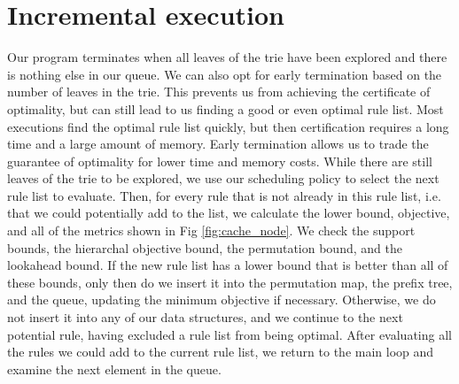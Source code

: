 \section{Incremental execution}
Our program terminates when all leaves of the trie have been explored and there is nothing else in our queue.
We can also opt for early termination based on the number of leaves in the trie.
This prevents us from achieving the certificate of optimality, but can still lead to us finding a good or even optimal rule list.
Most executions find the optimal rule list quickly, but then certification requires a long time and a large amount of memory.
Early termination allows us to trade the guarantee of optimality for lower time and memory costs.
While there are still leaves of the trie to be explored, we use our scheduling policy to select the next rule list to evaluate.
Then, for every rule that is not already in this rule list, i.e. that we could potentially add to the list, we calculate the lower bound, objective, and all of the metrics shown in Fig \ref{fig:cache_node}.
We check the support bounds, the hierarchal objective bound, the permutation bound, and the lookahead bound.
If the new rule list has a lower bound that is better than all of these bounds, only then do we insert it into the permutation map, the prefix tree, and the queue, updating the minimum objective if necessary.
Otherwise, we do not insert it into any of our data structures, and we continue to the next potential rule, having excluded a rule list from being optimal.
After evaluating all the rules we could add to the current rule list, we return to the main loop and examine the next element in the queue.

